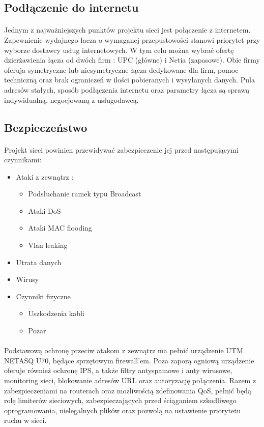 \subsection{Podłączenie do internetu}
\paragraph{}
Jednym z najważniejszych punktów projektu sieci jest połączenie z internetem. Zapewnienie wydajnego łacza o wymaganej przepustowości stanowi priorytet przy wyborze dostawcy usług internetowych. W tym celu można wybrać ofertę dzierżawienia łącza od dwóch firm : UPC (główne) i Netia (zapasowe). Obie firmy oferuja symetryczne lub niesymetryczne łącza dedykowane dla firm, pomoc techniczną oraz brak ograniczeń w ilości pobieranych i wysyłanych danych. Pula adresów stałych, sposób podłączenia internetu oraz parametry łącza są sprawą indywidualną, negocjowaną z usługodawcą.

\subsection{Bezpieczeństwo}
\paragraph{}
Projekt sieci powinien przewidywać zabezpieczenie jej przed następującymi czynnikami:
\begin{itemize}
	\item Ataki z zewnątrz :
	\begin{itemize}
		\item Podsłuchanie ramek typu Broadcast
		\item Ataki DoS
		\item Ataki MAC flooding
		\item Vlan leaking
	\end{itemize}
	\item Utrata danych
	\item Wirusy
	\item Czynniki fizyczne
	\begin{itemize}
		\item Uszkodzenia kabli
		\item Pożar
	\end{itemize}
\end{itemize}

\paragraph{}
Podstawową ochronę przeciw atakom z zewnątrz ma pełnić urządzenie UTM NETASQ U70, będące sprzętowym firewall'em. Poza zaporą ogniową  urządzenie oferuje również ochronę IPS, a także filtry antyspamowe i anty wirusowe, monitoring sieci, blokowanie adresów URL oraz autoryzację połączenia. Razem z zabezpieczeniami na routerach oraz możliwością zdefinowania QoS, pełnić będą rolę limiterów sieciowych, zabezpieczających przed ściąganiem szkodliwego oprogramowania, nielegalnych plików oraz pozwolą na ustawienie priorytetu ruchu w sieci.

